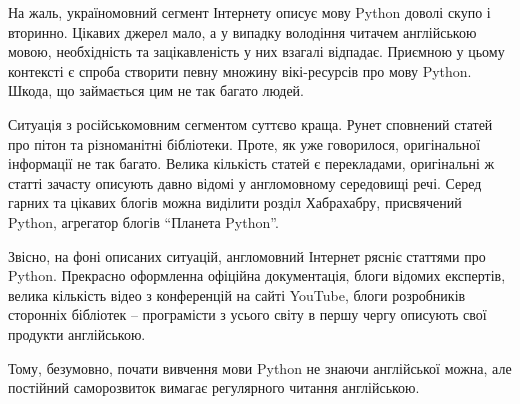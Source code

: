\documentclass[a4paper, 12pt, onsedie]{article}
\begin{document}
    На жаль, україномовний сегмент Інтернету описує мову Python доволі скупо і вторинно.
    Цікавих джерел мало, а у випадку володіння читачем англійською мовою, необхідність та
    зацікавленість у них взагалі відпадає. Приємною у цьому контексті є спроба створити 
    певну множину вікі-ресурсів про мову Python. Шкода, що займається цим не так багато
    людей.

    Ситуація з російськомовним сегментом суттєво краща. Рунет сповнений статей про пітон та
    різноманітні бібліотеки. Проте, як уже говорилося, оригінальної інформації не так багато.
    Велика кількість статей є перекладами, оригінальні ж статті зачасту описують давно відомі у
    англомовному середовищі речі. Серед гарних та цікавих блогів можна виділити розділ Хабрахабру,
    присвячений Python, агрегатор блогів ``Планета Python''.

    Звісно, на фоні описаних ситуацій, англомовний Інтернет рясніє статтями про Python. Прекрасно
    оформленна офіційна документація, блоги відомих експертів, велика кількість відео
    з конференцій на сайті YouTube, блоги розробників сторонніх бібліотек -- програмісти з усього
    світу в першу чергу описують свої продукти англійською.

    Тому, безумовно, почати вивчення мови Python не знаючи англійської можна, але постійний
    саморозвиток вимагає регулярного читання англійською.
\end{document}
